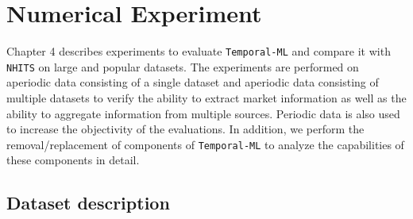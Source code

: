 
\chapter{Numerical Experiment}
\label{chap:experiment}


Chapter 4 describes experiments to evaluate \verb|Temporal-ML| and compare it with \verb|NHITS| on large and popular datasets. The experiments are performed on aperiodic data consisting of a single dataset and aperiodic data consisting of multiple datasets to verify the ability to extract market information as well as the ability to aggregate information from multiple sources. Periodic data is also used to increase the objectivity of the evaluations. In addition, we perform the removal/replacement of components of \verb|Temporal-ML| to analyze the capabilities of these components in detail.


\section{Dataset description}


